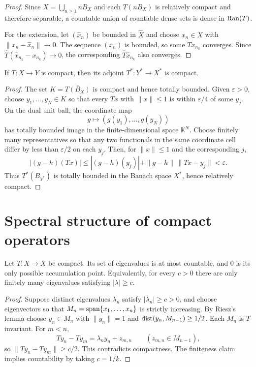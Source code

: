 \begin{proof}
Since $X=\bigcup_{n\ge1}nB_X$ and each $T(nB_X)$ is relatively compact and
therefore separable, a countable union of countable dense sets is dense in
$\operatorname{Ran}(T)$.

For the extension, let $(\widehat x_n)$ be bounded in $\widehat X$ and choose
$x_n\in X$ with $\|x_n-\widehat x_n\|\to0$.  The sequence $(x_n)$ is bounded,
so some $Tx_{n_k}$ converges.  Since
$\widehat T(\widehat x_{n_k}-x_{n_k})\to0$, the corresponding
$\widehat T\widehat x_{n_k}$ also converges.
\end{proof}

\begin{notetheorem}
If $T\colon X\to Y$ is compact, then its adjoint
$T^*\colon Y^*\to X^*$ is compact.
\end{notetheorem}

\begin{proof}
The set $K=\overline{T(B_X)}$ is compact and hence totally bounded.  Given
$\varepsilon>0$, choose $y_1,\ldots,y_N\in K$ so that every $Tx$ with
$\|x\|\le1$ is within $\varepsilon/4$ of some $y_j$.  On the dual unit ball,
the coordinate map
\[
  g\longmapsto(g(y_1),\ldots,g(y_N))
\]
has totally bounded image in the finite-dimensional space $\mathbb K^N$.
Choose finitely many representatives so that any two functionals in the same
coordinate cell differ by less than $\varepsilon/2$ on each $y_j$.
Then, for $\|x\|\le1$ and the corresponding $j$,
\[
 |(g-h)(Tx)|
 \le |(g-h)(y_j)|+\|g-h\|\,\|Tx-y_j\|<\varepsilon.
\]
Thus $T^*(B_{Y^*})$ is totally bounded in the Banach space $X^*$, hence
relatively compact.
\end{proof}

\section{Spectral structure of compact operators}

\begin{notetheorem}
Let $T\colon X\to X$ be compact.  Its set of eigenvalues is at most
countable, and $0$ is its only possible accumulation point.  Equivalently,
for every $c>0$ there are only finitely many eigenvalues satisfying
$|\lambda|\ge c$.
\end{notetheorem}

\begin{proof}
Suppose distinct eigenvalues $\lambda_n$ satisfy $|\lambda_n|\ge c>0$, and
choose eigenvectors so that
$M_n=\operatorname{span}\{x_1,\ldots,x_n\}$ is strictly increasing.  By Riesz's lemma choose
$y_n\in M_n$ with $\|y_n\|=1$ and
$\operatorname{dist}(y_n,M_{n-1})\ge1/2$.  Each $M_n$ is $T$-invariant.  For $m<n$,
\[
  Ty_n-Ty_m
  =\lambda_n y_n+z_{m,n}
  \qquad(z_{m,n}\in M_{n-1}),
\]
so $\|Ty_n-Ty_m\|\ge c/2$.  This contradicts compactness.  The finiteness
claim implies countability by taking $c=1/k$.
\end{proof}

